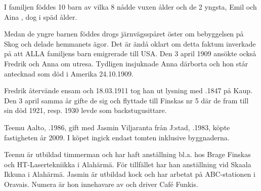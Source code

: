 I familjen föddes 10 barn av vilka 8 nådde vuxen ålder och de 2 yngsta, Emil  och Aina , dog i späd ålder.
\begin{jhchildren}
  \item {}
  \item {}
  \item {}
  \item {}
  \item {}
  \item {}
  \item {}
  \item {}
\end{jhchildren}

Medan de yngre barnen föddes drogs järnvägsspåret öster om bebyggelsen på Skog och delade hemmanets ägor. Det är ändå oklart om detta faktum inverkade på att ALLA familjens barn emigrerade till USA. Den 3 april 1909 ansökte också Fredrik och Anna om utresa. Tydligen insjuknade Anna därborta och hon står antecknad som död i Amerika 24.10.1909.

Fredrik återvände ensam och 18.03.1911 tog han ut lysning med  .1847 på Kaup. Den 3 april samma år gifte de sig och flyttade till Finskas nr 5 där de fram till sin död 1921, resp. 1930 levde som backstugusittare.



%



%
Teemu Aalto, .1986, gift med Jasmin Viljaranta från J:stad, .1983, köpte fastigheten år 2009. I köpet ingick endast tomten inklusive byggnaderna.

Teemu är utbildad timmerman och har haft anställning bl.a. hos Brage Finskas och HT-Lasertekniikka i Alahärmä. För tillfället har han anställning vid Skaala Ikkuna i Alahärmä. Jasmin är utbildad kock och har arbetat på ABC-stationen i Oravais. Numera är hon innehavare av och driver Café Funkis.
\begin{jhchildren}
  \item {}
  \item {}
  \item {}
\end{jhchildren}


